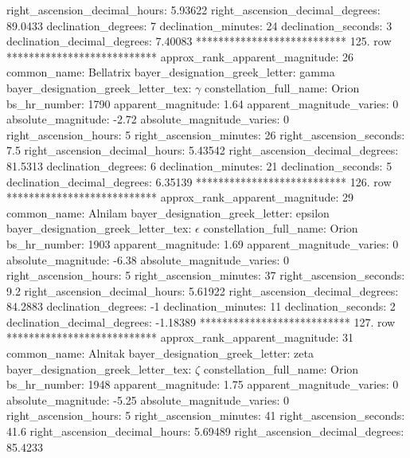      right_ascension_decimal_hours: 5.93622
   right_ascension_decimal_degrees: 89.0433
               declination_degrees: 7
               declination_minutes: 24
               declination_seconds: 3
       declination_decimal_degrees: 7.40083
*************************** 125. row ***************************
    approx_rank_apparent_magnitude: 26
                       common_name: Bellatrix
    bayer_designation_greek_letter: gamma
bayer_designation_greek_letter_tex: $\gamma$
           constellation_full_name: Orion
                      bs_hr_number: 1790
                apparent_magnitude: 1.64
         apparent_magnitude_varies: 0
                absolute_magnitude: -2.72
         absolute_magnitude_varies: 0
             right_ascension_hours: 5
           right_ascension_minutes: 26
           right_ascension_seconds: 7.5
     right_ascension_decimal_hours: 5.43542
   right_ascension_decimal_degrees: 81.5313
               declination_degrees: 6
               declination_minutes: 21
               declination_seconds: 5
       declination_decimal_degrees: 6.35139
*************************** 126. row ***************************
    approx_rank_apparent_magnitude: 29
                       common_name: Alnilam
    bayer_designation_greek_letter: epsilon
bayer_designation_greek_letter_tex: $\epsilon$
           constellation_full_name: Orion
                      bs_hr_number: 1903
                apparent_magnitude: 1.69
         apparent_magnitude_varies: 0
                absolute_magnitude: -6.38
         absolute_magnitude_varies: 0
             right_ascension_hours: 5
           right_ascension_minutes: 37
           right_ascension_seconds: 9.2
     right_ascension_decimal_hours: 5.61922
   right_ascension_decimal_degrees: 84.2883
               declination_degrees: -1
               declination_minutes: 11
               declination_seconds: 2
       declination_decimal_degrees: -1.18389
*************************** 127. row ***************************
    approx_rank_apparent_magnitude: 31
                       common_name: Alnitak
    bayer_designation_greek_letter: zeta
bayer_designation_greek_letter_tex: $\zeta$
           constellation_full_name: Orion
                      bs_hr_number: 1948
                apparent_magnitude: 1.75
         apparent_magnitude_varies: 0
                absolute_magnitude: -5.25
         absolute_magnitude_varies: 0
             right_ascension_hours: 5
           right_ascension_minutes: 41
           right_ascension_seconds: 41.6
     right_ascension_decimal_hours: 5.69489
   right_ascension_decimal_degrees: 85.4233
